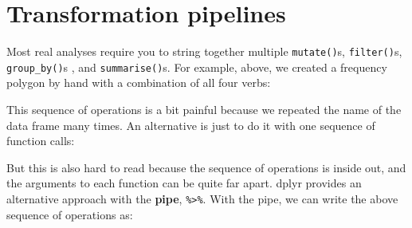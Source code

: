 \section{Transformation pipelines}

Most real analyses require you to string together multiple
\texttt{mutate()}s, \texttt{filter()}s, \texttt{group\_by()}s , and
\texttt{summarise()}s. For example, above, we created a frequency
polygon by hand with a combination of all four verbs: \indexc{\%>\%}

\begin{Shaded}
\begin{Highlighting}[]
\StringTok{ }
\StringTok{ } \NormalTok{())}
\StringTok{ }\StringTok{ }\StringTok{ }\NormalTok{)}
\StringTok{ } \StringTok{ }
\end{Highlighting}
\end{Shaded}

This sequence of operations is a bit painful because we repeated the
name of the data frame many times. An alternative is just to do it with
one sequence of function calls:

\begin{Shaded}
\begin{Highlighting}[]
\NormalTok{(}
  \NormalTok{(}
    \NormalTok{(}
      \NormalTok{(}
      \NormalTok{), }
       \NormalTok{()}
    \NormalTok{), }
    \StringTok{ }\NormalTok{, }
    \StringTok{ }
  \NormalTok{), }
   \StringTok{ }
\NormalTok{)}
\end{Highlighting}
\end{Shaded}

But this is also hard to read because the sequence of operations is
inside out, and the arguments to each function can be quite far apart.
dplyr provides an alternative approach with the \textbf{pipe},
\texttt{\%\textgreater{}\%}. With the pipe, we can write the above
sequence of operations as:

